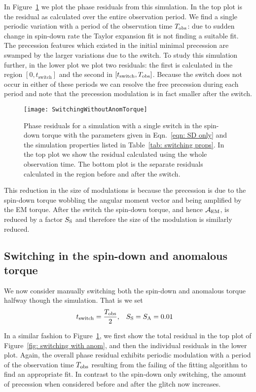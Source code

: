 \documentclass[../full_thesis/full_thesis.tex]{subfiles}
\begin{document}
In Figure~\ref{fig: switching without anom} we plot the phase residuals from
this simulation. In the top plot is the residual as calculated over the entire
observation period. We find a single periodic variation with a period of the
observation time $T_{\mathrm{obs}}$: due to sudden change in spin-down rate the Taylor
expansion fit is not finding a suitable fit. The precession features which
existed in the initial minimal precession are swamped by the larger variations
due to the switch. To study this simulation further, in the lower plot we plot
two residuals: the first is calculated in the region $[0, t_{\mathrm{switch}}]$
and the second in $[t_{\mathrm{switch}}, T_{\mathrm{obs}}]$. Because the switch does not
occur in either of these periods we can resolve the free precession during each
period and note that the precession modulation is in fact smaller after the
switch.
\begin{figure}[htb]
\texttt{[image: SwitchingWithoutAnomTorque]}
\caption{Phase residuals for a simulation with a single switch in the spin-down
torque with the parameters given in Eqn.~\eqref{eqn: SD only} and the
simulation properties listed in Table~\ref{tab: switching props}. In the top
plot we show the residual calculated using the whole observation time. The
bottom plot is the separate residuals calculated in the region before and after
the switch.}
\label{fig: switching without anom}
\end{figure}
This reduction in the size of modulations is because the precession is due to
the spin-down torque wobbling the angular moment vector and being amplified by
the EM torque. After the switch the spin-down torque, and hence $\mathcal{A}_{\mathrm{EM}}$, is
reduced by a factor $S_{\mathrm{S}}$ and therefore the size of the modulation is similarly
reduced.

\subsection{Switching in the spin-down and anomalous torque}
We now consider manually switching both the spin-down and anomalous torque
halfway though the simulation.  That is we set
\begin{align}
    t_{\mathrm{switch}} = \frac{T_{\mathrm{obs}}}{2}, &&& S_{\mathrm{S}} = S_{\mathrm{A}} = 0.01
\label{eqn: SD and A}
\end{align}

In a similar fashion to Figure~\ref{fig: switching without anom}, we first show
the total residual in the top plot of Figure~\ref{fig: switching with anom}, and
then the individual residuals in the lower plot. Again, the overall phase
residual exhibits periodic modulation with a period of the observation time $T_{\mathrm{obs}}$
resulting from the failing of the fitting algorithm to find an appropriate fit.
In contrast to the spin-down only switching, the amount of precession when
considered before and after the glitch now increases.
\end{document}
